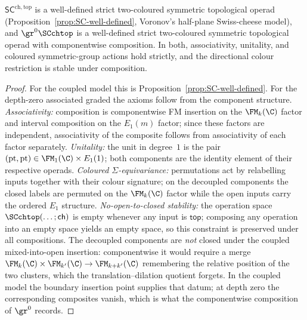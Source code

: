 \begin{proposition}[\ClaimStatusProvedHere]
\label{prop:SC-operad}
$\mathsf{SC}^{\mathrm{ch,top}}$ is a well-defined strict
two-coloured symmetric topological operad
(Proposition~\ref{prop:SC-well-defined}, Voronov's half-plane
Swiss-cheese model), and $\gr^0\SCchtop$ is a well-defined strict
two-coloured symmetric topological operad with componentwise
composition. In both, associativity, unitality, and coloured
symmetric-group actions hold strictly, and the directional colour
restriction is stable under composition.
\end{proposition}

\begin{proof}
For the coupled model this is
Proposition~\ref{prop:SC-well-defined}. For the depth-zero
associated graded the axioms follow from the component structure.
\emph{Associativity:} composition is componentwise FM insertion on the $\FM_k(\C)$ factor and interval composition on the $E_1(m)$ factor; since these factors are independent, associativity of the composite follows from associativity of each factor separately.
\emph{Unitality:} the unit in degree~$1$ is the pair $(\mathrm{pt},\mathrm{pt}) \in \FM_1(\C) \times E_1(1)$; both components are the identity element of their respective operads.
\emph{Coloured $\Sigma$-equivariance:} permutations act by relabelling inputs together with their colour signature; on the decoupled components the closed labels are permuted on the $\FM_k(\C)$ factor while the open inputs carry the ordered $E_1$ structure.
\emph{No-open-to-closed stability:} the operation space $\SCchtop(\ldots;\mathsf{ch})$ is empty whenever any input is $\mathsf{top}$; composing any operation into an empty space yields an empty space, so this constraint is preserved under all compositions.
The decoupled components are \emph{not} closed under the coupled
mixed-into-open insertion: componentwise it would require a merge
$\FM_k(\C)\times\FM_{k'}(\C)\to\FM_{k+k'}(\C)$ remembering the
relative position of the two clusters, which the
translation--dilation quotient forgets. In the coupled model the
boundary insertion point supplies that datum; at depth zero the
corresponding composites vanish, which is what the componentwise
composition of $\gr^0$ records.
\end{proof}

